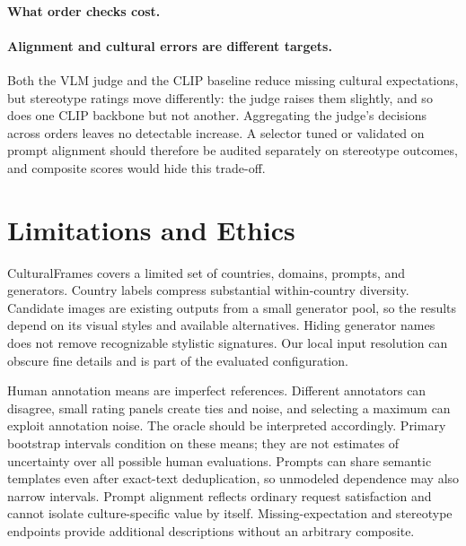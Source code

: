 \documentclass[letterpaper]{article}
\begin{document}
\paragraph{What order checks cost.}
 

\paragraph{Alignment and cultural errors are different targets.}
Both the VLM judge and the CLIP baseline reduce missing cultural expectations, but stereotype ratings move differently: the judge raises them slightly, and so does one CLIP backbone but not another. Aggregating the judge's decisions across orders leaves no detectable increase. A selector tuned or validated on prompt alignment should therefore be audited separately on stereotype outcomes, and composite scores would hide this trade-off.

\section{Limitations and Ethics}
CulturalFrames covers a limited set of countries, domains, prompts, and generators. Country labels compress substantial within-country diversity. Candidate images are existing outputs from a small generator pool, so the results depend on its visual styles and available alternatives. Hiding generator names does not remove recognizable stylistic signatures. Our local input resolution can obscure fine details and is part of the evaluated configuration.

Human annotation means are imperfect references. Different annotators can disagree, small rating panels create ties and noise, and selecting a maximum can exploit annotation noise. The oracle should be interpreted accordingly. Primary bootstrap intervals condition on these means; they are not estimates of uncertainty over all possible human evaluations. Prompts can share semantic templates even after exact-text deduplication, so unmodeled dependence may also narrow intervals. Prompt alignment reflects ordinary request satisfaction and cannot isolate culture-specific value by itself. Missing-expectation and stereotype endpoints provide additional descriptions without an arbitrary composite.
\end{document}
